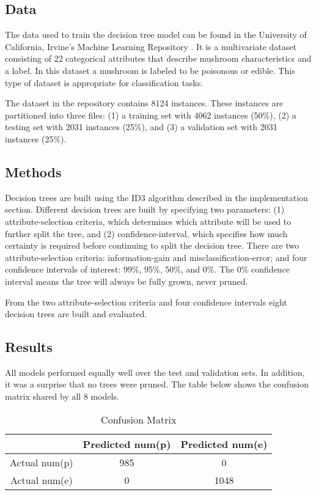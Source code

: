 \documentclass{IEEEtran}
\begin{document}
\subsection{Data}
The data used to train the decision tree model can be found in the
University of California, Irvine's Machine Learning
Repository \parencite{schlimmer1981mushroom}. It is a multivariate dataset
consisting of 22 categorical attributes that describe mushroom
characteristics and a label. In this dataset a mushroom is labeled to
be poisonous or edible. This type of dataset is appropriate for
classification tasks.

The dataset in the repository contains 8124 instances. These instances
are partitioned into three files: (1) a training set with 4062 instances
(50\%), (2) a testing set with 2031 instances (25\%), and (3) a
validation set with 2031 instances (25\%).

\subsection{Methods}
Decision trees are built using the ID3 algorithm described in the
implementation section. Different decision trees are built by
specifying two parameters: (1) attribute-selection criteria, which
determines which attribute will be used to further split the tree, and (2)
confidence-interval, which specifies how much certainty is required before
continuing to split the decision tree.  There are two
attribute-selection criteria: information-gain and
misclassification-error; and four confidence intervals of interest:
99\%,  95\%, 50\%, and 0\%. The 0\% confidence interval means the tree
will always be fully grown, never pruned.

From the two attribute-selection criteria and four confidence
intervals eight decision trees are built and evaluated.

\subsection{Results}
All models performed equally well over the test and validation
sets. In addition,  it was a surprise that no trees were pruned. The
table below shows the confusion matrix shared by all 8 models.

\begin{table}[ht]
  \caption{Confusion Matrix}
  \centering
  \begin{tabular}{c c c }
  \hline\hline
                & Predicted num(p) & Predicted num(e) \\ [0.5ex]
  \hline
  Actual num(p) &              985 &                0 \\
  Actual num(e) &                0 &             1048 \\ [1ex]
  \hline
  \end{tabular}
  \label{table:nonlin}
\end{table}
\end{document}
